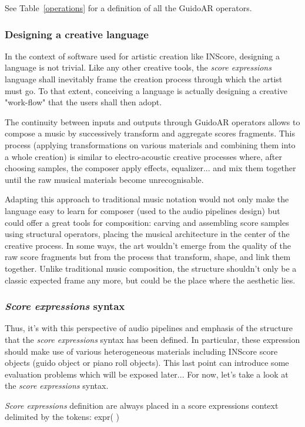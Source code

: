 \documentclass{article}
\newenvironment{INScode}		{\vspace{-2mm}\small\verbatim}{\endverbatim\vspace{-2mm}}
\newcommand{\sExpr}{\emph{score expressions} }
\newcommand{\SExpr}{\emph{Score expressions} }
\begin{document}
See Table~\ref{operations} for a definition of all the GuidoAR operators.

\subsubsection{Designing a creative language}
In the context of software used for artistic creation like INScore, designing a language is not trivial. Like any other creative tools,  the \sExpr language shall inevitably frame the creation process through which the artist must go. To that extent, conceiving a language is actually designing a creative "work-flow" that the users shall then adopt.

The continuity between inputs and outputs through GuidoAR operators allows to compose a music by successively transform and aggregate scores fragments. This process (applying transformations on various materials and combining them into a whole creation) is similar to electro-acoustic creative processes where, after choosing samples, the composer apply effects, equalizer... and mix them together until the raw musical materials become unrecognisable.

Adapting this approach to traditional music notation would not only make the language easy to learn for composer (used to the audio pipelines design) but could offer a great tools for composition: carving and assembling score samples using structural operators, placing the musical architecture in the center of the creative process. In some ways, the art wouldn't emerge from the quality of the raw score fragments but from the process that transform, shape, and link them together. Unlike traditional music composition, the structure shouldn't only be a classic expected frame any more, but could be the place where the aesthetic lies.

\subsubsection{\SExpr syntax}

Thus, it's with this perspective of audio pipelines and emphasis of the structure that the \sExpr syntax has been defined. In particular, these expression should make use of various heterogeneous materials including INScore score objects (guido object or piano roll objects). This last point can introduce some evaluation problems which will be exposed later... For now, let's take a look at the \sExpr syntax.

\smallbreak
\SExpr definition are always placed in a score expressions context delimited by the tokens:
\begin{INScode}
expr(      )
\end{INScode}
\end{document}

